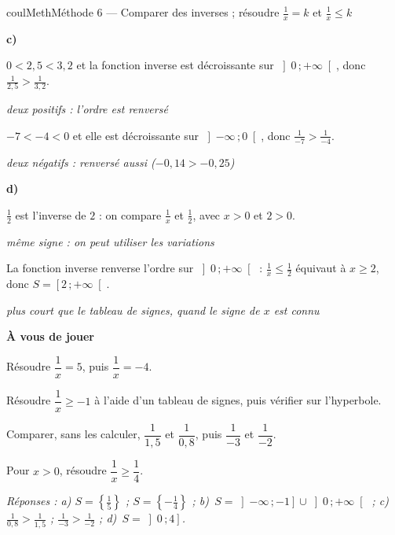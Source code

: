 \documentclass[11pt,a4paper]{article}
\makeatletter
\renewcommand{\le}{\leqslant}
\renewcommand{\ge}{\geqslant}
\newcommand{\lycee@repere}[4]{%
  \draw[grille,step=1] (#1,#2) grid (#3,#4);
  \draw[-{Stealth[length=2mm]},thick] (#1,0)--({#3+0.4},0) node[below left=-1pt]{$x$};
  \draw[-{Stealth[length=2mm]},thick] (0,#2)--(0,{#4+0.4}) node[below left=-1pt]{$y$};
  \node[below left,font=\scriptsize,inner sep=1.5pt] at (0,0) {$0$};}
\newcommand{\lycee@gradx}[1]{\foreach \k/\l in {#1}{%
  \draw (\k,0.07)--(\k,-0.07) node[below,font=\scriptsize,inner sep=1.5pt]{$\l$};}}
\newcommand{\lycee@grady}[1]{\foreach \k/\l in {#1}{%
  \draw (0.07,\k)--(-0.07,\k) node[left,font=\scriptsize,inner sep=1.5pt]{$\l$};}}
\newcommand{\lycee@intfo}[2]{\left[#1\,;#2\right[}
\newcommand{\lycee@intof}[2]{\left]#1\,;#2\right]}
\newcommand{\lycee@intoo}[2]{\left]#1\,;#2\right[}
\newcommand{\lycee@ens}[1]{\left\{#1\right\}}
\providecommand{\repere}{\lycee@repere}%
\providecommand{\gradx}{\lycee@gradx}%
\providecommand{\grady}{\lycee@grady}%
\providecommand{\intfo}{\lycee@intfo}%
\providecommand{\intof}{\lycee@intof}%
\providecommand{\intoo}{\lycee@intoo}%
\providecommand{\ens}{\lycee@ens}}
\newcounter{lycee@signet}
\newcommand{\signet}[3][]{\stepcounter{lycee@signet}%
  \edef\lycee@dest{\if\relax\detokenize{#1}\relax
    signet.\arabic{lycee@signet}\else#1\fi}%
  \hypertarget{\lycee@dest}{}\bookmark[level=#2,dest=\lycee@dest]{#3}}
\newcommand{\res}[1]{#1}
\newcounter{methode}
\newenvironment{methodebox}[1][Méthode]{\stepcounter{methode}%
  \begin{boitecours}[phantom={\signet[methode-\arabic{methode}]{2}{#1}}]{coulMeth}{#1}}%
  {\end{boitecours}}
\newcommand{\etape}[1]{\par\smallskip\textbf{\color{coulMeth}#1}\par\nobreak\smallskip}
\newcommand{\reponse}[1]{\par\smallskip
  {\footnotesize\itshape\color{black!55}Réponses : #1}}
\newcommand{\explique}[2]{\par\smallskip\noindent
  \begin{minipage}[t]{0.57\linewidth}\raggedright #1\end{minipage}\hfill
  \begin{minipage}[t]{0.40\linewidth}\raggedright\leavevmode
    {\small\itshape\color{black!60}#2}\end{minipage}\par}
\newcommand{\cas}[1]{\par\smallskip\noindent\textbf{\color{coulExo}#1}\vadjust{\nobreak}}
\newenvironment{correction}{\par}{\par}
\makeatother
\begin{document}
\begin{methodebox}[Méthode 6 --- Comparer des inverses ; résoudre $\frac{1}{x}=k$ et $\frac{1}{x}\le k$]
\begin{correction}
\begin{minipage}[c]{0.58\linewidth}
\smallskip

\end{minipage}\hfill
\begin{minipage}[c]{0.38\linewidth}\centering
{}
\end{minipage}
\cas{c)}
\explique{$0<2{,}5<3{,}2$ et la fonction inverse est décroissante sur $\intoo{0}{+\infty}$,
donc \res{$\frac{1}{2{,}5}>\frac{1}{3{,}2}$}.}{deux positifs : l'ordre est renversé}
\explique{$-7<-4<0$ et elle est décroissante sur $\intoo{-\infty}{0}$, donc
\res{$\frac{1}{-7}>\frac{1}{-4}$}.}{deux négatifs : renversé aussi ($-0{,}14>-0{,}25$)}
\cas{d)}
\explique{$\frac12$ est l'inverse de $2$ : on compare $\frac{1}{x}$ et $\frac{1}{2}$, avec
$x>0$ et $2>0$.}{même signe : on peut utiliser les variations}
\explique{La fonction inverse renverse l'ordre sur $\intoo{0}{+\infty}$ :
$\frac{1}{x}\le\frac12$ équivaut à $x\ge 2$, donc $S=\res{\intfo{2}{+\infty}}$.}{plus court que
le tableau de signes, quand le signe de $x$ est connu}
\end{correction}

\etape{À vous de jouer}
\begin{questions}[label=\alph*)]
  \item Résoudre $\dfrac{1}{x}=5$, puis $\dfrac{1}{x}=-4$.
  \item Résoudre $\dfrac{1}{x}\ge -1$ à l'aide d'un tableau de signes, puis vérifier sur
        l'hyperbole.
  \item Comparer, sans les calculer, $\dfrac{1}{1{,}5}$ et $\dfrac{1}{0{,}8}$, puis
        $\dfrac{1}{-3}$ et $\dfrac{1}{-2}$.
  \item Pour $x>0$, résoudre $\dfrac{1}{x}\ge\dfrac14$.
\end{questions}
\reponse{a) $S=\ens{\frac15}$ ;\; $S=\ens{-\frac14}$ ;\;
 b)~$S=\intof{-\infty}{-1}\cup\intoo{0}{+\infty}$ ;\;
 c)~$\frac{1}{0{,}8}>\frac{1}{1{,}5}$ ;\; $\frac{1}{-3}>\frac{1}{-2}$ ;\; d)~$S=\intof{0}{4}$.}
\end{methodebox}
\end{document}
